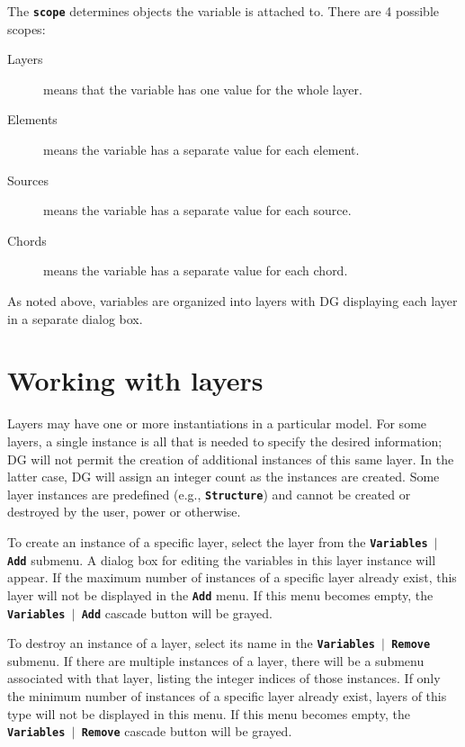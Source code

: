 \documentclass[12pt]{report}
\begin{document}
The \textbf{\texttt{scope}} determines objects the variable is
attached to. There are 4 possible scopes:

\begin{description}
\item[Layers] means that the variable has one value for the
whole layer.
\item[Elements] means the variable has a separate value for
each element.
\item[Sources] means the variable has a separate value for
each source.
\item[Chords] means the variable has a separate value for
each chord.
\end{description}

As noted above, variables are organized 
into layers with DG displaying each
layer in a separate dialog box.

\section{Working with layers}

Layers may have one or more instantiations in a particular
model.  For some layers, a single instance is 
all that is needed 
to specify the desired information; DG will not
permit the creation of additional instances of this same
layer.  In the latter case, DG will assign an integer
count as the instances are created. 
Some layer instances are predefined (e.g., 
\textbf{\texttt{Structure}}) and cannot be created or destroyed
by the user, power or otherwise.

To create an instance of a specific layer, select the
layer from the
\textbf{\texttt{Variables  \begin{math}\vert{}\end{math}  Add}} submenu. A
dialog box for editing the variables in this layer
instance will
appear. If the maximum number of instances of a specific layer already
exist, this layer will not be displayed in the \textbf{\texttt{Add}}
menu. If this menu
becomes empty, the
\textbf{\texttt{Variables  \begin{math}\vert{}\end{math}  Add}} cascade
button will be grayed.

To destroy an instance of a layer, select its name in the
\textbf{\texttt{Variables  \begin{math}\vert{}\end{math}  Remove}} submenu.
If there are multiple instances of a layer, there will be a submenu associated
with that layer, listing the integer indices of those instances.
If only the minimum number of instances of a specific layer already exist,
layers of this type will not be displayed in this menu. If this menu
becomes empty, the
\textbf{\texttt{Variables \begin{math}\vert{}\end{math} Remove}} cascade
button will be grayed.
\end{document}
